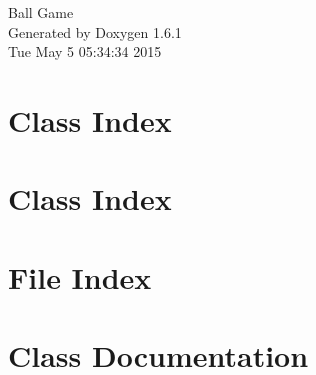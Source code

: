 \documentclass[a4paper]{book}
\begin{document}
\hypersetup{pageanchor=false}
\begin{titlepage}
\vspace*{7cm}
\begin{center}
{\Large Ball Game }\\
\vspace*{1cm}
{\large Generated by Doxygen 1.6.1}\\
\vspace*{0.5cm}
{\small Tue May 5 05:34:34 2015}\\
\end{center}
\end{titlepage}
\clearemptydoublepage
{}
\tableofcontents
\clearemptydoublepage
{}
\hypersetup{pageanchor=true}
\chapter{Class Index}

\chapter{Class Index}

\chapter{File Index}

\chapter{Class Documentation}




























\end{document}
